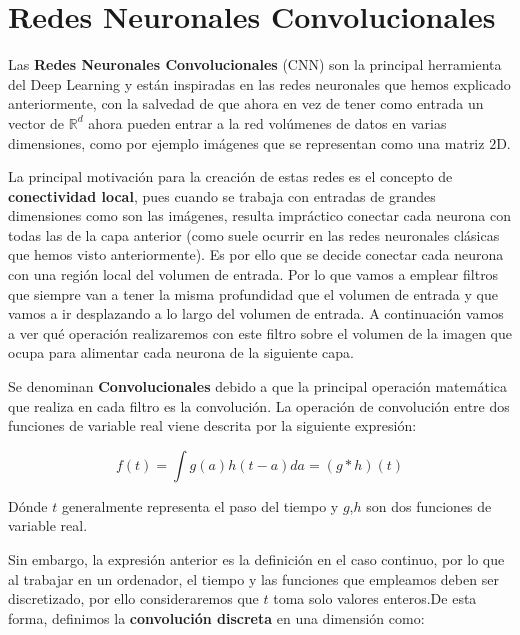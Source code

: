 \section{Redes Neuronales Convolucionales}
    \noindent Las \textbf{Redes Neuronales Convolucionales} (CNN) son la principal herramienta del Deep Learning y están inspiradas en las redes neuronales que hemos explicado anteriormente, con la salvedad de que ahora en vez de tener como entrada un vector de $\mathbb{R}^d$ ahora pueden entrar a la red volúmenes de datos en varias dimensiones, como por ejemplo imágenes que se representan como una matriz $2$D.
    
    \medskip

    \noindent La principal motivación para la creación de estas redes es el concepto de \textbf{conectividad local}, pues cuando se trabaja con entradas de grandes dimensiones como son las imágenes, resulta impráctico conectar cada neurona con todas las de la capa anterior (como suele ocurrir en las redes neuronales clásicas que hemos visto anteriormente). Es por ello que se decide conectar cada neurona con una región local del volumen de entrada. Por lo que vamos a emplear filtros que siempre van a tener la misma profundidad que el volumen de entrada y que vamos a ir desplazando a lo largo del volumen de entrada. A continuación vamos a ver qué operación realizaremos con este filtro sobre el volumen de la imagen que ocupa para alimentar cada neurona de la siguiente capa.

    \medskip

    \noindent Se denominan \textbf{Convolucionales} debido a que la principal operación matemática que realiza en cada filtro es la convolución. La operación de convolución entre dos funciones de variable real viene descrita por la siguiente expresión:

    \begin{equation}
        f(t)=\int g(a) h(t-a) da = (g \ast h)(t)
    \end{equation}

    \noindent Dónde $t$ generalmente representa el paso del tiempo y $g$,$h$ son dos funciones de variable real.

    \medskip

    \noindent Sin embargo, la expresión anterior es la definición en el caso continuo, por lo que al trabajar en un ordenador, el tiempo y las funciones que empleamos deben ser discretizado, por ello consideraremos que $t$ toma solo valores enteros.De esta forma, definimos la \textbf{convolución discreta} en una dimensión como: 

